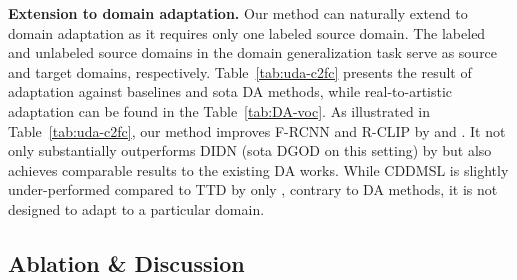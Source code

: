 \textbf{Extension to domain adaptation.} Our method can naturally extend to domain adaptation as it requires only one labeled source domain. The labeled and unlabeled source domains in the domain generalization task serve as source and target domains, respectively. Table~\ref{tab:uda-c2fc} presents the result of \emph{} adaptation against baselines and sota DA methods, while real-to-artistic adaptation can be found in the Table~\ref{tab:DA-voc}. As illustrated in Table~\ref{tab:uda-c2fc}, our method improves F-RCNN and R-CLIP by  and .
It not only substantially outperforms DIDN (sota DGOD on this setting) by  but also achieves comparable results to the existing DA works. While CDDMSL is slightly under-performed compared to TTD by only , contrary to DA methods, it is not designed to adapt to a particular domain.

\subsection{Ablation \& Discussion}
\label{sec:ablation}
